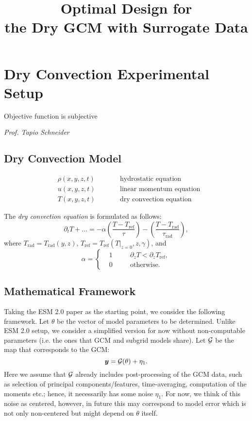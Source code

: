\documentclass{report}
\title{\Huge Optimal Design for \\ the Dry GCM with Surrogate Data}
\date{}
\author{}
\begin{document}
\maketitle

\chapter{Dry Convection Experimental Setup}

\epigraph{Objective function is subjective}{\textit{Prof. Tapio Schneider}}

\section{Dry Convection Model}

\begin{equation}
  \begin{aligned}
  &\rho(x, y, z, t) \qquad &&\text{hydrostatic equation}\\
  &u(x, y, z, t) \qquad &&\text{linear momentum equation}\\
  &T(x, y, z, t) \qquad &&\text{dry convection equation}
  \end{aligned}
\end{equation}

The \emph{dry convection equation} is formulated as follows:
\begin{equation}
  \partial_t T + \ldots =
  -\alpha \left( \dfrac{T - T_{\text{ref}}}{\tau} \right)
  -\left( \dfrac{T - T_{\text{rad}}}{\tau_{\text{rad}}}\right),
\end{equation}
where $T_{\text{rad}} = T_{\text{rad}} (y,z)$, $T_{\text{ref}} = T_{\text{ref}}(T\rvert_{z=0}, z, \gamma)$, and
\[
  \alpha = \left\{
    \begin{aligned}
      &1 \quad &&\partial_z T < \partial_z T_{\text{ref}}, \\
      &0 \quad &&\text{otherwise}.
    \end{aligned}
  \right.
\]

\section{Mathematical Framework}

Taking the ESM 2.0 paper as the starting point, we consider the following framework.
Let $\theta$ be the vector of model parameters to be determined.
Unlike ESM 2.0 setup, we consider a simplified version for now without non-computable parameters (i.e. the ones that GCM and subgrid models share).
Let $\mathcal{G}$ be the map that corresponds to the GCM:
\begin{equation}
  \bm{y} = \mathcal{G}(\theta) + \eta_1.
\end{equation}
Here we assume that $\mathcal{G}$ already includes post-processing of the GCM data, such as selection of principal components/features, time-averaging, computation of the moments etc.; hence, it necessarily has some noise $\eta_1$.
For now, we think of this noise as centered, however, in future this may correspond to model error which is not only non-centered but might depend on $\theta$ itself.
\end{document}
